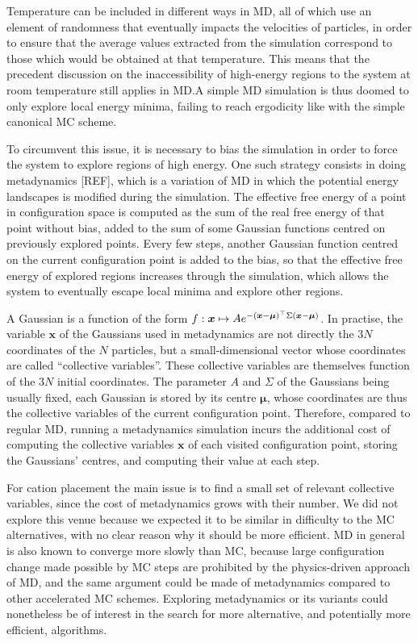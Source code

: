 \documentclass[main.tex]{subfiles}
\begin{document}
Temperature can be included in different ways in MD, all of which use an element of randomness that eventually impacts the velocities of particles, in order to ensure that the average values extracted from the simulation correspond to those which would be obtained at that temperature. This means that the precedent discussion on the inaccessibility of high-energy regions to the system at room temperature still applies in MD.\@ A simple MD simulation is thus doomed to only explore local energy minima, failing to reach ergodicity like with the simple canonical MC scheme.

To circumvent this issue, it is necessary to bias the simulation in order to force the system to explore regions of high energy. One such strategy consists in doing metadynamics [REF], which is a variation of MD in which the potential energy landscapes is modified during the simulation. The effective free energy of a point in configuration space is computed as the sum of the real free energy of that point without bias, added to the sum of some Gaussian functions centred on previously explored points. Every few steps, another Gaussian function centred on the current configuration point is added to the bias, so that the effective free energy of explored regions increases through the simulation, which allows the system to eventually escape local minima and explore other regions.

A Gaussian is a function of the form $f:\boldsymbol x\mapsto Ae^{-\left(\boldsymbol x - \boldsymbol\mu\right)^\top\Sigma\left(\boldsymbol x - \boldsymbol\mu\right)}$. In practise, the variable $\boldsymbol x$ of the Gaussians used in metadynamics are not directly the $3N$ coordinates of the $N$ particles, but a small-dimensional vector whose coordinates are called ``collective variables''. These collective variables are themselves function of the $3N$ initial coordinates. The parameter $A$ and $\Sigma$ of the Gaussians being usually fixed, each Gaussian is stored by its centre $\boldsymbol\mu$, whose coordinates are thus the collective variables of the current configuration point. Therefore, compared to regular MD, running a metadynamics simulation incurs the additional cost of computing the collective variables $\boldsymbol x$ of each visited configuration point, storing the Gaussians' centres, and computing their value at each step.

For cation placement the main issue is to find a small set of relevant collective variables, since the cost of metadynamics grows with their number. We did not explore this venue because we expected it to be similar in difficulty to the MC alternatives, with no clear reason why it should be more efficient. MD in general is also known to converge more slowly than MC, because large configuration change made possible by MC steps are prohibited by the physics-driven approach of MD, and the same argument could be made of metadynamics compared to other accelerated MC schemes. Exploring metadynamics or its variants could nonetheless be of interest in the search for more alternative, and potentially more efficient, algorithms.

\OnlyInSubfile{\printglobalbibliography}
\end{document}
